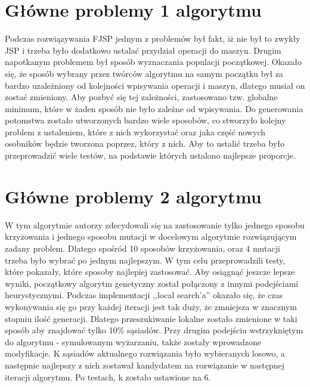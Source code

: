 \documentclass{article}
\begin{document}
\section{Główne problemy 1 algorytmu}
 Podczas rozwiązywania FJSP jednym z problemów był fakt, iż nie był to zwykły JSP i trzeba było dodatkowo ustalać przydział operacji do maszyn. Drugim napotkanym problemem był sposób wyznaczania populacji początkowej. Okazało się, że sposób wybrany przez twórców algorytmu na samym początku był za bardzo uzależniony od kolejności wpisywania operacji i maszyn, dlatego musiał on zostać zmieniony. Aby pozbyć się tej zależności, zastosowano tzw. globalne minimum, które w żaden sposób nie było zależne od wpisywania. Do generowania potomstwa zostało utworzonych bardzo wiele sposobów, co stworzyło kolejny problem z ustaleniem, które z nich wykorzystać oraz jaka część nowych osobników będzie tworzona poprzez, który z nich. Aby to ustalić trzeba było przeprowadzić wiele testów, na podstawie których ustalono najlepsze proporcje.

\section{Główne problemy 2 algorytmu}
 W tym algorytmie autorzy zdecydowali się na zastosowanie tylko jednego sposobu krzyżowania i jednego sposobu mutacji w docelowym algorytmie rozwiązującym zadany problem. Dlatego spośród 10 sposobów krzyżowania, oraz 4 mutacji trzeba było wybrać po jednym najlepszym. W tym celu przeprowadzili testy, które pokazały, które sposoby najlepiej zastosować. Aby osiągnąć jeszcze lepsze wyniki, początkowy algorytm genetyczny został połączony z innymi podejściami heurystycznymi. Podczas implementacji ,,local search'a'' okazało się, że czas wykonywania się go przy każdej iteracji jest tak duży, że zmniejsza w znacznym stopniu ilość generacji. Dlatego przeszukiwanie lokalne zostało zmienione w taki sposób aby znajdować tylko 10\% sąsiadów. Przy drugim podejściu wstrzykniętym do algorytmu - symulowanym wyżarzaniu, także zostały wprowadzone modyfikacje. K sąsiadów aktualnego rozwiązania było wybieranych losowo, a następnie najlepszy z nich zostawał kandydatem na rozwiązanie w następnej iteracji algorytmu. Po testach, k zostało ustawione na 6.
\end{document}
